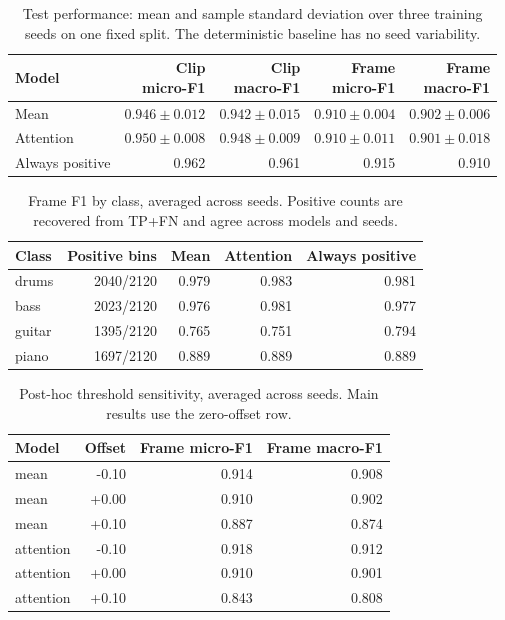\begin{table}[htbp]\centering\small
\caption{Test performance: mean and sample standard deviation over three training seeds on one fixed split. The deterministic baseline has no seed variability.}\label{tab:main}
\begin{tabular}{lrrrr}\toprule
Model & \shortstack{Clip\\micro-F1} & \shortstack{Clip\\macro-F1} & \shortstack{Frame\\micro-F1} & \shortstack{Frame\\macro-F1} \\\midrule
Mean & $0.946 \pm 0.012$ & $0.942 \pm 0.015$ & $0.910 \pm 0.004$ & $0.902 \pm 0.006$ \\
Attention & $0.950 \pm 0.008$ & $0.948 \pm 0.009$ & $0.910 \pm 0.011$ & $0.901 \pm 0.018$ \\
Always positive & 0.962 & 0.961 & 0.915 & 0.910 \\
\bottomrule\end{tabular}\end{table}

\begin{table}[htbp]\centering\small
\caption{Frame F1 by class, averaged across seeds. Positive counts are recovered from TP+FN and agree across models and seeds.}\label{tab:classes}
\begin{tabular}{lrrrr}\toprule
Class & Positive bins & Mean & Attention & Always positive \\\midrule
drums & 2040/2120 & 0.979 & 0.983 & 0.981 \\
bass & 2023/2120 & 0.976 & 0.981 & 0.977 \\
guitar & 1395/2120 & 0.765 & 0.751 & 0.794 \\
piano & 1697/2120 & 0.889 & 0.889 & 0.889 \\
\bottomrule\end{tabular}\end{table}

\begin{table}[htbp]\centering\small
\caption{Post-hoc threshold sensitivity, averaged across seeds. Main results use the zero-offset row.}\label{tab:sensitivity}
\begin{tabular}{lrrr}\toprule
Model & Offset & Frame micro-F1 & Frame macro-F1 \\\midrule
mean & -0.10 & 0.914 & 0.908 \\
mean & +0.00 & 0.910 & 0.902 \\
mean & +0.10 & 0.887 & 0.874 \\
attention & -0.10 & 0.918 & 0.912 \\
attention & +0.00 & 0.910 & 0.901 \\
attention & +0.10 & 0.843 & 0.808 \\
\bottomrule\end{tabular}\end{table}
